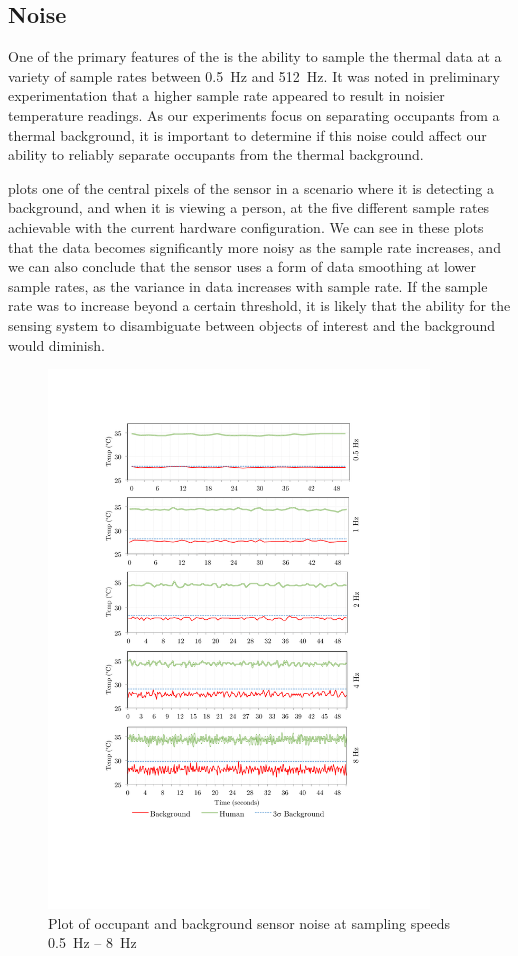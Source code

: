 \documentclass[../thesis/thesis.tex]{subfiles}
\begin{document}
\subsection{Noise}

One of the primary features of the \mlx is the ability to sample the thermal data at a variety of sample rates between 0.5~Hz and 512~Hz. It was noted in preliminary experimentation that a higher sample rate appeared to result in noisier temperature readings. As our experiments focus on separating occupants from a thermal background, it is important to determine if this noise could affect our ability to reliably separate occupants from the thermal background.

 plots one of the central pixels of the sensor in a scenario where it is detecting a background, and when it is viewing a person, at the five different sample rates achievable with the current hardware configuration. We can see in these plots that the data becomes significantly more noisy as the sample rate increases, and we can also conclude that the sensor uses a form of data smoothing at lower sample rates, as the variance in data increases with sample rate. If the sample rate was to increase beyond a certain threshold, it is likely that the ability for the sensing system to disambiguate between objects of interest and the background would diminish.

\begin{figure}
  \centering
  \includegraphics[width=0.9\textwidth]{../diagrams/noise-graph4.pdf}
  \caption{Plot of occupant and background sensor noise at sampling speeds 0.5~Hz -- 8~Hz}
  \label{fig:noise}
\end{figure}
\end{document}
